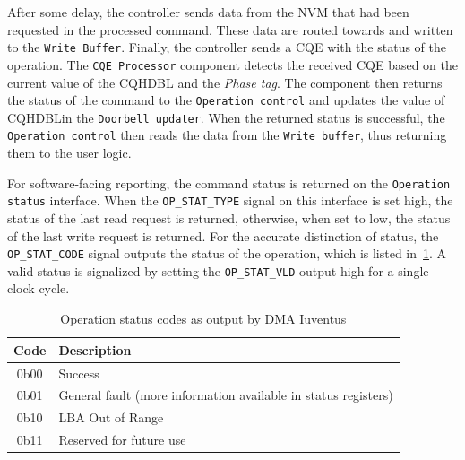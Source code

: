 
After some delay, the controller sends data from the \ac{NVM} that had been requested in the
processed command. These data are routed towards and written to the \verb|Write Buffer|. Finally,
the controller sends a \ac{CQE} with the status of the operation. The \verb|CQE Processor| component
detects the received \ac{CQE} based on the current value of the \ac{CQHDBL} and the \emph{Phase
tag}. The component then returns the status of the command to the \verb|Operation control| and
updates the value of \ac{CQHDBL}\footnotemark\@ in the \verb|Doorbell updater|. When the returned
status is successful, the \verb|Operation control| then reads the data from the \verb|Write buffer|,
thus returning them to the user logic.

For software-facing reporting, the command status is returned on the
\verb|Operation| \verb|status| interface. When the \verb|OP_STAT_TYPE| signal on this interface is set
high, the status of the last read request is returned, otherwise, when set to low, the status
of the last write request is returned. For the accurate distinction of status, the
\verb|OP_STAT_CODE| signal outputs the status of the operation, which is listed
in~\cref{tab:op_stat_codes}. A valid status is signalized by setting the \verb|OP_STAT_VLD| output
high for a single clock cycle.


\begin{table}[!ht]
    \centering
    \caption{Operation status codes as output by DMA Iuventus}
    \label{tab:op_stat_codes}
    \begin{tabular}{cl}
    \toprule
    \textbf{Code} & \textbf{Description}                                                     \\
    \midrule
    0b00       & Success                                                         \\
    0b01       & General fault (more information available in status registers)  \\
    0b10       & LBA Out of Range                                                \\
    0b11       & Reserved for future use                                         \\
    \bottomrule
    \end{tabular}
\end{table}

